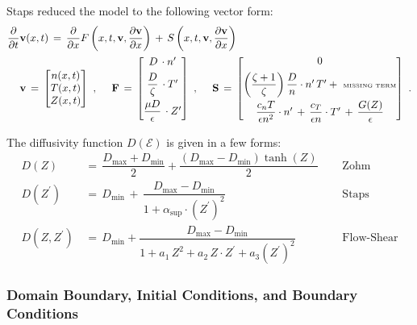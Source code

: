 \documentclass[a4paper,8pt]{article}
\begin{document}
Staps reduced the model to the following vector form:
\small\begin{align}
    \dfrac{\partial}{\partial t} \mathbf{v}&(x,t) \,=\, \dfrac{\partial}{\partial x} F\left(x, t, \mathbf{v}, \dfrac{\partial\mathbf{v}}{\partial x}\right) \,+\, S\left(x, t, \mathbf{v}, \dfrac{\partial\mathbf{v}}{\partial x}\right) \\
\mathbf{v}& \,=\,\begin{bmatrix} n(x, t) \\ T(x, t) \\ Z(x, t) \end{bmatrix}~,~~~~
\mathbf{F} \,=\, \begin{bmatrix}
            D\,\cdot n^\prime \\[1ex]
            \dfrac{D}{\zeta}\,\cdot T^\prime \\[2ex]
            \dfrac{\mu D}{\epsilon}\,\cdot Z^\prime
            \end{bmatrix}~,~~~~
\mathbf{S} \,=\, \begin{bmatrix}
            0 \\[1ex]
            \left(\dfrac{\zeta + 1}{\zeta}\right) \dfrac{D}{n} \cdot n^\prime \, T^\prime +~\tiny{\text{MISSING TERM}}\\[2ex]
            \dfrac{c_n T}{\epsilon n^2} \cdot n^\prime \,+\, \dfrac{c_T}{\epsilon n} \cdot T^\prime \,+\, \dfrac{G(Z)}{\epsilon}
            \end{bmatrix}~.
\end{align}\normalsize

The diffusivity function \(D(\mathcal{E})\) is given in a few forms:
\small\begin{align}
    D(Z) \,&=\, \dfrac{D_\text{max} + D_\text{min}}{2} + \dfrac{(D_\text{max} - D_\text{min})\tanh(Z)}{2} ~~~~~~ &\text{Zohm} \\
    D(Z^\prime) \,&=\, D_\text{min} \,+\, \dfrac{D_\text{max} - D_\text{min}}{1 + \alpha_\text{sup}\cdot(Z^\prime)^2} ~~~~~~ &\text{Staps} \\
    D(Z, Z^\prime) \,&=\, D_\text{min} + \dfrac{D_\text{max} - D_\text{min}}{1 + a_1\,Z^2 + a_2\,Z \cdot Z^\prime + a_3\left(Z^\prime\right)^2} ~~~~~~ &\text{Flow-Shear}
\end{align}\normalsize

\hypertarget{domain-boundary-initial-conditions-and-boundary-conditions}{%
\subsubsection{Domain Boundary, Initial Conditions, and Boundary
Conditions}\label{domain-boundary-initial-conditions-and-boundary-conditions}}
\end{document}
